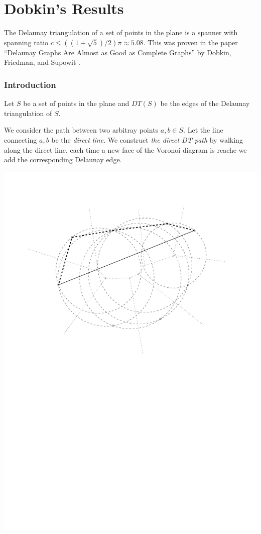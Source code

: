 \documentclass{tufte-handout}
\title{\DocTitle}
\author{\DocAuthor}
\begin{document}
\maketitle


\part{Dobkin's Results}

The Delaunay triangulation of a set of points in the plane is a
spanner with spanning ratio $c \le ((1 + \sqrt{5})/2)\pi \approx
5.08$.  This was proven in the paper ``Delaunay Graphs Are Almost as
Good as Complete Graphs'' by Dobkin, Friedman, and Supowit
\cite{Dobkin:1987} \cite{Dobkin:1990}.

\section{Introduction}

Let $S$ be a set of points in the plane and $DT(S)$ be the edges of
the Delaunay triangulation of $S$.

We consider the path between two arbitray points $a,b \in S$.  Let the
line connecting $a,b$ be the \emph{direct line}.  We construct
\emph{the direct DT path} by walking along the direct line, each time
a new face of the Voronoi diagram is reache we add the corresponding
Delaunay edge.

\includegraphics[scale=0.75]{figures/voronoi2.pdf}
\end{document}
